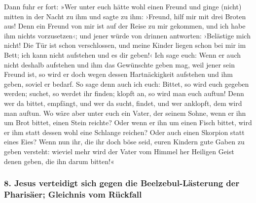  Dann fuhr er fort: »Wer unter euch hätte wohl einen
Freund und ginge (nicht) mitten in der Nacht zu ihm und sagte zu ihm:
›Freund, hilf mir mit drei Broten aus!  Denn ein Freund
von mir ist auf der Reise zu mir gekommen, und ich habe ihm nichts
vorzusetzen‹;  und jener würde von drinnen antworten:
›Belästige mich nicht! Die Tür ist schon verschlossen, und meine Kinder
liegen schon bei mir im Bett; ich kann nicht aufstehen und es dir
geben!‹  Ich sage euch: Wenn er auch nicht deshalb
aufstehen und ihm das Gewünschte geben mag, weil jener sein Freund ist,
so wird er doch wegen dessen Hartnäckigkeit aufstehen und ihm geben,
soviel er bedarf.  So sage denn auch ich euch: Bittet, so
wird euch gegeben werden; suchet, so werdet ihr finden; klopft an, so
wird man euch auftun!  Denn wer da bittet, empfängt, und
wer da sucht, findet, und wer anklopft, dem wird man auftun.
 Wo wäre aber unter euch ein Vater, der seinem Sohne,
wenn er ihn um Brot bittet, einen Stein reichte? Oder wenn er ihn um
einen Fisch bittet, wird er ihm statt dessen wohl eine Schlange reichen?
 Oder auch einen Skorpion statt eines Eies?
 Wenn nun ihr, die ihr doch böse seid, euren Kindern gute
Gaben zu geben versteht: wieviel mehr wird der Vater vom Himmel her
Heiligen Geist denen geben, die ihn darum bitten!«

\hypertarget{jesus-verteidigt-sich-gegen-die-beelzebul-luxe4sterung-der-pharisuxe4er-gleichnis-vom-ruxfcckfall}{%
\subsubsection{8. Jesus verteidigt sich gegen die Beelzebul-Lästerung
der Pharisäer; Gleichnis vom
Rückfall}\label{jesus-verteidigt-sich-gegen-die-beelzebul-luxe4sterung-der-pharisuxe4er-gleichnis-vom-ruxfcckfall}}

